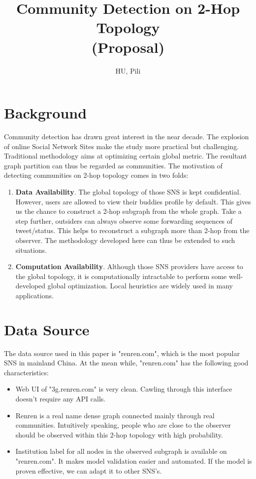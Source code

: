 \documentclass[11pt,a4paper]{article}
\author{HU, Pili}
\title{Community Detection on 2-Hop Topology \\(Proposal)}
\begin{document}
\maketitle

\section{Background}

Community detection has drawn great interest in the near decade. 
The explosion of online Social Network Sites make the study more 
practical but challenging. Traditional methodology aims at 
optimizing certain global metric. The resultant graph partition 
can thus be regarded as communities. The motivation of detecting 
communities on 2-hop topology comes in two folds: 
\begin{enumerate}
	\item \textbf{Data Availability}. The global topology of 
	those SNS is kept confidential. However, users are allowed 
	to view their buddies profile by default. This gives us the 
	chance to construct a 2-hop subgraph from the whole graph. 
	Take a step further, outsiders can always observe some forwarding 
	sequences of tweet/status. This helps to reconstruct a 
	subgraph more than 2-hop from the observer. The methodology 
	developed here can thus be extended to such situations. 
	\item \textbf{Computation Availability}. Although those SNS 
	providers have access to the global topology, it is computationally
	intractable to perform some well-developed global optimization. 
	Local heuristics are widely used in many applications. 
\end{enumerate}

\section{Data Source}

The data source used in this paper is "renren.com", which is the 
most popular SNS in mainland China. At the mean while, "renren.com" 
has the following good characteristics:
\begin{itemize}
	\item Web UI of "3g.renren.com" is very clean. Cawling through
	this interface doesn't require any API calls.  
	\item Renren is a real name dense graph connected mainly through 
	real communities. Intuitively speaking, 
	people who are close to the observer should be observed within 
	this 2-hop topology with high probability. 
	\item Institution label for all nodes in the observed subgraph
	is available on "renren.com". It makes model validation easier
	and automated. If the model is proven effective, we can adapt 
	it to other SNS's. 
\end{itemize}
\end{document}
